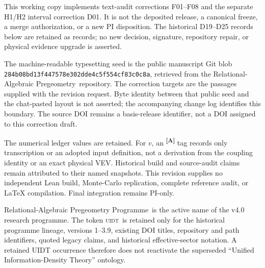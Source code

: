 \documentclass[12pt,a4paper,twoside]{article}
\theoremstyle{plain}
\theoremstyle{definition}
\theoremstyle{remark}
\newcommand{\ProjectName}{Relational-Algebraic Pregeometry Programme}
\newcommand{\ProjectShort}{Relational-Algebraic Pregeometry}
\newcommand{\UIDT}{\textsc{uidt}} %
\newcommand{\catmark}[1]{\textsuperscript{\textsf{\textbf{[#1]}}}}
\begin{document}
\thispagestyle{uidtontology}

\begin{governancebox}
This working copy implements text-audit corrections F01--F08 and the separate
H1/H2 interval correction D01. It is not the deposited release, a canonical
freeze, a merge authorization, or a new PI disposition. The historical
D19--D25 records below are retained as records; no new decision, signature,
repository repair, or physical evidence upgrade is asserted.

The machine-readable typesetting seed is the public manuscript Git blob
\nolinkurl{284b08bd13f447578e302dde4c5f554cf83c0c8a}, retrieved from the
\ProjectShort\ repository. The correction targets are the passages supplied
with the revision request. Byte identity between that public seed and the
chat-pasted layout is not asserted; the accompanying change log identifies
this boundary. The source DOI remains a basis-release identifier, not a DOI
assigned to this correction draft.

The numerical ledger values are retained. For $v$, an \catmark{A} tag records
only transcription or an adopted input definition, not a derivation from the
coupling identity or an exact physical VEV. Historical build and source-audit
claims remain attributed to their named snapshots. This revision supplies
no independent Lean build, Monte-Carlo replication, complete reference audit,
or LaTeX compilation. Final integration remains PI-only.
\end{governancebox}

\begin{governancebox}
\ProjectName\ is the active name of the v4.0 research programme. The token
\UIDT\ is retained only for the historical programme lineage, versions
1--3.9, existing DOI titles, repository and path identifiers, quoted legacy
claims, and historical effective-sector notation. A retained UIDT occurrence
therefore does not reactivate the superseded ``Unified Information-Density
Theory'' ontology.
\end{governancebox}
\end{document}
